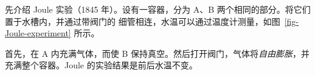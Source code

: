 %     
%     
%     
%     
%     
%     
%     
%     
%     

先介绍 Joule 实验（1845 年）。设有一容器，分为 A、B 两个相同的部分。将它们置于水槽内，并通过带阀门的
细管相连，水温可以通过温度计测量，如图~\ref{fig-Joule-experiment} 所示。

首先，在 A 内充满气体，而使 B 保持真空。然后打开阀门，气体将\emph{自由膨胀}，并充满整个容器。Joule
的实验结果是前后水温不变。

